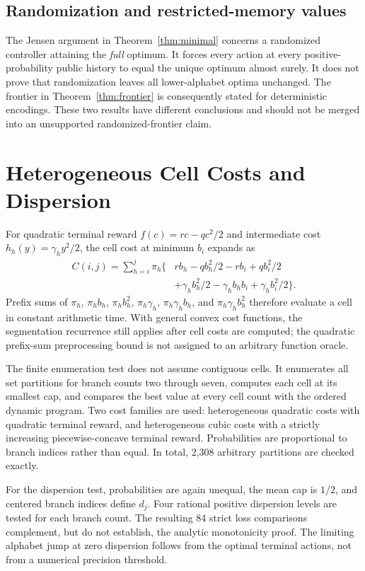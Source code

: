 \subsection{Randomization and restricted-memory values}
The Jensen argument in Theorem~\ref{thm:minimal} concerns a randomized controller attaining the \emph{full} optimum. It forces every action at every positive-probability public history to equal the unique optimum almost surely. It does not prove that randomization leaves all lower-alphabet optima unchanged. The frontier in Theorem~\ref{thm:frontier} is consequently stated for deterministic encodings. These two results have different conclusions and should not be merged into an unsupported randomized-frontier claim.

\section{Heterogeneous Cell Costs and Dispersion}\label{ec:frontier}
For quadratic terminal reward $f(c)=rc-qc^2/2$ and intermediate cost $h_h(y)=\gamma_hy^2/2$, the cell cost at minimum $b_i$ expands as
\begin{align*}
 C(i,j)=\sum_{h=i}^j\pi_h\{&r b_h-qb_h^2/2-rb_i+qb_i^2/2\\
                         &+\gamma_hb_h^2/2-\gamma_hb_hb_i+\gamma_hb_i^2/2\}.
\end{align*}
Prefix sums of $\pi_h$, $\pi_hb_h$, $\pi_hb_h^2$, $\pi_h\gamma_h$, $\pi_h\gamma_hb_h$, and $\pi_h\gamma_hb_h^2$ therefore evaluate a cell in constant arithmetic time. With general convex cost functions, the segmentation recurrence still applies after cell costs are computed; the quadratic prefix-sum preprocessing bound is not assigned to an arbitrary function oracle.

The finite enumeration test does not assume contiguous cells. It enumerates all set partitions for branch counts two through seven, computes each cell at its smallest cap, and compares the best value at every cell count with the ordered dynamic program. Two cost families are used: heterogeneous quadratic costs with quadratic terminal reward, and heterogeneous cubic costs with a strictly increasing piecewise-concave terminal reward. Probabilities are proportional to branch indices rather than equal. In total, 2,308 arbitrary partitions are checked exactly.

For the dispersion test, probabilities are again unequal, the mean cap is $1/2$, and centered branch indices define $d_j$. Four rational positive dispersion levels are tested for each branch count. The resulting 84 strict loss comparisons complement, but do not establish, the analytic monotonicity proof. The limiting alphabet jump at zero dispersion follows from the optimal terminal actions, not from a numerical precision threshold.

